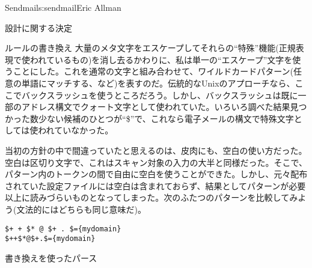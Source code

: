 \begin{aosachapter}{Sendmail}{s:sendmail}{Eric Allman}
\begin{aosasect1}{設計に関する決定}
\begin{aosasect2}{ルールの書き換え}
大量のメタ文字をエスケープしてそれらの``特殊''機能(正規表現で使われているもの)を消し去るかわりに、私は単一の``エスケープ''文字を使うことにした。これを通常の文字と組み合わせて、ワイルドカードパターン(任意の単語にマッチする、など)を表すのだ。伝統的なUnixのアプローチなら、ここでバックスラッシュを使うところだろう。しかし、バックスラッシュは既に一部のアドレス構文でクォート文字として使われていた。いろいろ調べた結果見つかった数少ない候補のひとつが``\$''で、これなら電子メールの構文で特殊文字としては使われていなかった。

当初の方針の中で間違っていたと思えるのは、皮肉にも、空白の使い方だった。空白は区切り文字で、これはスキャン対象の入力の大半と同様だった。そこで、パターン内のトークンの間で自由に空白を使うことができた。しかし、元々配布されていた設定ファイルには空白は含まれておらず、結果としてパターンが必要以上に読みづらいものとなってしまった。次のふたつのパターンを比較してみよう(文法的にはどちらも同じ意味だ)。

\begin{verbatim}
$+ + $* @ $+ . $={mydomain}
$++$*@$+.$={mydomain}
\end{verbatim}

\end{aosasect2}

\begin{aosasect2}{書き換えを使ったパース}


\end{aosasect2}
\end{aosasect1}
\end{aosachapter}
